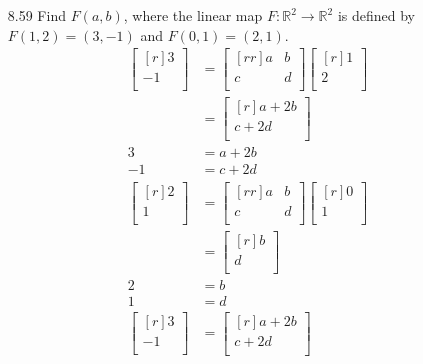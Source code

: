\documentclass[12pt]{article}
\theoremstyle{definition}
\theoremstyle{plain}
\begin{document}
\begin{enumerate}
\item[8.59] Find $F(a,b)$, where the linear map $F:\mathbb{R}^2 \rightarrow \mathbb{R}^2$ is defined by $F(1,2)=(3,-1)$ and $F(0,1)=(2,1)$.
	\begin{align*}
	\begin{bmatrix}[r]3\\-1\\\end{bmatrix}&=\begin{bmatrix}[rr]a&b\\c&d\\\end{bmatrix}\begin{bmatrix}[r]1\\2\\\end{bmatrix}\\
	&= \begin{bmatrix}[r]a+2b\\c+2d\\\end{bmatrix}\\
	3&=a+2b\\
	-1&=c+2d\\
	\begin{bmatrix}[r]2\\1\\\end{bmatrix} &= \begin{bmatrix}[rr]a&b\\c&d\\\end{bmatrix}\begin{bmatrix}[r]0\\1\\\end{bmatrix}\\
	&= \begin{bmatrix}[r]b\\d\\\end{bmatrix}\\
	2&=b\\
	1&=d\\
	\begin{bmatrix}[r]3\\-1\\\end{bmatrix} &= \begin{bmatrix}[r]a+2b\\c+2d\\\end{bmatrix}\\

\end{align*}
\end{enumerate}
\end{document}
